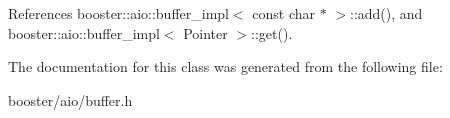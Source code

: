 \-References booster\-::aio\-::buffer\-\_\-impl$<$ const char $\ast$ $>$\-::add(), and booster\-::aio\-::buffer\-\_\-impl$<$ Pointer $>$\-::get().



\-The documentation for this class was generated from the following file\-:\begin{DoxyCompactItemize}
\item 
booster/aio/buffer.\-h\end{DoxyCompactItemize}
